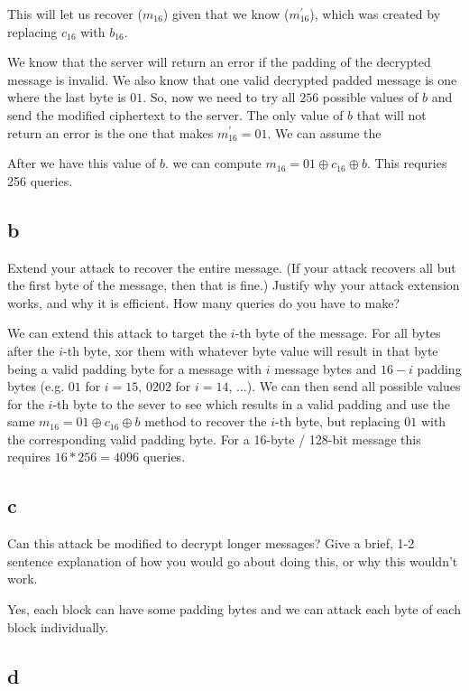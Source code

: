 \documentclass[11pt]{article}
\begin{document}
This will let us recover ($m_{16}$) given that we know ($m^\prime_{16}$), which was created by replacing $c_{16}$ with $b_{16}$. 

We know that the server will return an error if the padding of the decrypted message is invalid. We also know that one valid decrypted padded message is one where the last byte is $01$. So, now we need to try all $256$ possible values of $b$ and send the modified ciphertext to the server. The only value of $b$ that will not return an error is the one that makes $m^\prime_{16} = 01$. We can assume the 

After we have this value of $b$. we can compute $m_{16} = 01 \oplus c_{16} \oplus b$. This requries 256 queries.

\subsection{b}

Extend your attack to recover the entire message. (If your attack recovers all but the first byte of the message, then that is fine.) Justify why your attack extension works, and why it is efficient. How many queries do you have to make?

We can extend this attack to target the $i$-th byte of the message. For all bytes after the $i$-th byte, xor them with whatever byte value will result in that byte being a valid padding byte for a message with $i$ message bytes and $16 - i$ padding bytes (e.g. $01$ for $i = 15$, $0202$ for $i = 14$, ...). We can then send all possible values for the $i$-th byte to the sever to see which results in a valid padding and use the same $m_{16} = 01 \oplus c_{16} \oplus b$ method to recover the $i$-th byte, but replacing $01$ with the corresponding valid padding byte. For a 16-byte / 128-bit message this requires $16 * 256 = 4096$ queries.

\subsection{c}

Can this attack be modified to decrypt longer messages? Give a brief, 1-2 sentence explanation of how you would go about doing this, or why this wouldn't work.

Yes, each block can have some padding bytes and we can attack each byte of each block individually.

\subsection{d}
\end{document}
